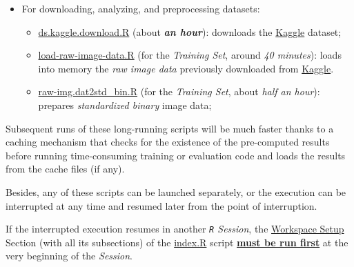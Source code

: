 \documentclass[
]{report}
\providecommand{\tightlist}{%
  \setlength{\itemsep}{0pt}\setlength{\parskip}{0pt}}
\begin{document}
\newpage

\begin{itemize}
\item
  For downloading, analyzing, and preprocessing datasets:

  \begin{itemize}
  \tightlist
  \item
    \href{https://github.com/AzKurban-edX-DS/edx.capstone.choose-your-own/blob/main/r/support-scripts/ds.kaggle.download.R}{ds.kaggle.download.R} (about \textbf{\emph{an hour}}): downloads the \href{https://www.kaggle.com/datasets/vaibhao/handwritten-characters}{Kaggle} dataset;
  \item
    \href{https://github.com/AzKurban-edX-DS/edx.capstone.choose-your-own/blob/main/r/support-scripts/load-raw-image-data.R}{load-raw-image-data.R} (for the \emph{Training Set}, around \emph{40 minutes}): loads into memory the \emph{raw image data} previously downloaded from \href{https://www.kaggle.com/datasets/vaibhao/handwritten-characters}{Kaggle}.
  \item
    \href{https://github.com/AzKurban-edX-DS/edx.capstone.choose-your-own/blob/main/r/support-scripts/raw-img.dat2std_bin.R}{raw-img.dat2std\_bin.R} (for the \emph{Training Set}, about \emph{half an hour}): prepares \emph{standardized binary} image data;
  \end{itemize}
\end{itemize}

\begin{noteblock}
Subsequent runs of these long-running scripts will be much faster thanks to a caching mechanism that checks for the existence of the pre-computed results before running time-consuming training or evaluation code and loads the results from the cache files (if any).

Besides, any of these scripts can be launched separately, or the execution can be interrupted at any time and resumed later from the point of interruption.

\end{noteblock}

\begin{importantblock}
If the interrupted execution resumes in another \emph{\texttt{R} Session}, the \href{https://github.com/AzKurban-edX-DS/edx.capstone.choose-your-own/blob/main/r/index.R\#L5-L160}{Workspace Setup} Section (with all its subsections) of the \href{https://github.com/AzKurban-edX-DS/edx.capstone.choose-your-own/blob/main/r/index.R}{index.R} script \textbf{\underline{must be run first}} at the very beginning of the \emph{Session}.

\end{importantblock}
\end{document}

